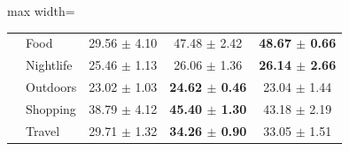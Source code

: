 \begin{table}[htbp]
\begin{adjustbox}{max width=\textwidth}
\begin{tabular}{clccc}
 & Food & 29.56 $\pm$ 4.10 & 47.48 $\pm$ 2.42 & \textbf{48.67 $\pm$ 0.66} \\
 & Nightlife & 25.46 $\pm$ 1.13 & 26.06 $\pm$ 1.36 & \textbf{26.14 $\pm$ 2.66} \\
 & Outdoors & 23.02 $\pm$ 1.03 & \textbf{24.62 $\pm$ 0.46} & 23.04 $\pm$ 1.44 \\
 & Shopping & 38.79 $\pm$ 4.12 & \textbf{45.40 $\pm$ 1.30} & 43.18 $\pm$ 2.19 \\
 & Travel & 29.71 $\pm$ 1.32 & \textbf{34.26 $\pm$ 0.90} & 33.05 $\pm$ 1.51 \\
\bottomrule
\end{tabular}
\end{adjustbox}
\end{table}
